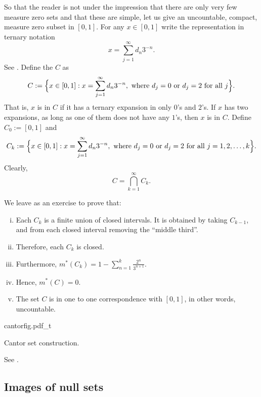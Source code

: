 \begin{example} \label{example:cantor}
So that the reader is not under the impression that there are only very few
measure zero sets and that these are simple,
let us give an uncountable, compact, measure zero subset in $[0,1]$.
For any $x \in [0,1]$ write the
representation in ternary notation
\begin{equation*}
x = \sum_{j=1}^\infty d_n 3^{-n} .
\end{equation*}
See .
Define the \emph{} $C$ as
\begin{equation*}
C := \Bigl\{ x \in [0,1] : x = \sum_{j=1}^\infty d_n 3^{-n}, \text{ where $d_j =
0$ or $d_j = 2$ for all $j$} \Bigr\} .
\end{equation*}
That is, $x$ is in $C$ if it has a ternary expansion in only $0$'s and
$2$'s.  If $x$ has two expansions, as long as one of them does not have any
$1$'s, then $x$ is in $C$.
Define $C_0 := [0,1]$ and
\begin{equation*}
C_k := \Bigl\{ x \in [0,1] : x = \sum_{j=1}^\infty d_n 3^{-n}, \text{ where $d_j =
0$ or $d_j = 2$ for all $j=1,2,\ldots,k$} \Bigr\} .
\end{equation*}
Clearly,
\begin{equation*}
C = \bigcap_{k=1}^\infty C_k .
\end{equation*}

\pagebreak[2]
We leave as an exercise to prove that:
\begin{enumerate}[(i)]
\item Each $C_k$ is a finite union of closed intervals.  It is obtained by
taking $C_{k-1}$, and from each closed interval removing the ``middle
third''.
\item Therefore, each $C_k$ is closed.
\item Furthermore,
$m^*(C_k) =1 - \sum_{n=1}^k \frac{2^n}{3^{n+1}}$.
\item Hence,
$m^*(C) = 0$.
\item The set $C$ is in one to one correspondence with $[0,1]$, in other
words,
uncountable.
\end{enumerate}
\begin{myfigureht}
{cantorfig.pdf_t}
\caption{Cantor set construction.\label{fig:cantor}}
\end{myfigureht}
See .
\end{example}


\subsection{Images of null sets}

